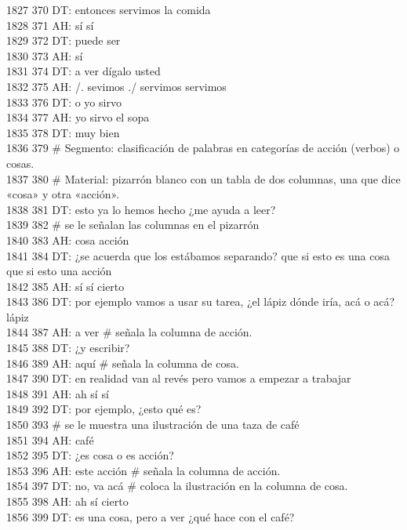1827 370 DT: entonces servimos la comida\\
1828 371 AH: sí sí\\
1829 372 DT: puede ser\\
1830 373 AH: sí\\
1831 374 DT: a ver dígalo usted\\
1832 375 AH: /. sevimos ./ servimos servimos\\
1833 376 DT: o yo sirvo\\
1834 377 AH: yo sirvo el sopa\\
1835 378 DT: muy bien\\
1836 379 # Segmento: clasificación de palabras en categorías de acción (verbos) o cosas.\\
1837 380 # Material: pizarrón blanco con un tabla de dos columnas, una  que dice «cosa» y otra «acción».\\
1838 381 DT: esto ya lo hemos hecho ¿me ayuda a leer?\\
1839 382 # se le señalan las columnas en el pizarrón\\
1840 383 AH: cosa acción\\
1841 384 DT: ¿se acuerda que los estábamos separando? que si esto es una cosa que si esto una acción\\
1842 385 AH: sí sí cierto\\
1843 386 DT: por ejemplo vamos a usar su tarea, ¿el lápiz dónde iría, acá o acá? lápiz\\
1844 387 AH: a ver # señala la columna de acción.\\
1845 388 DT: ¿y escribir?\\
1846 389 AH: aquí # señala la columna de cosa.\\
1847 390 DT: en realidad van al revés pero vamos a empezar a trabajar\\
1848 391 AH: ah sí sí\\
1849 392 DT: por ejemplo, ¿esto qué es?\\
1850 393 # se le muestra una ilustración de una taza de café\\
1851 394 AH: café\\
1852 395 DT: ¿es cosa o es acción?\\
1853 396 AH: este acción # señala la columna de acción.\\
1854 397 DT: no, va acá # coloca la ilustración en la columna de cosa.\\
1855 398 AH: ah sí cierto\\
1856 399 DT: es una cosa, pero a ver ¿qué hace con el café?\\
